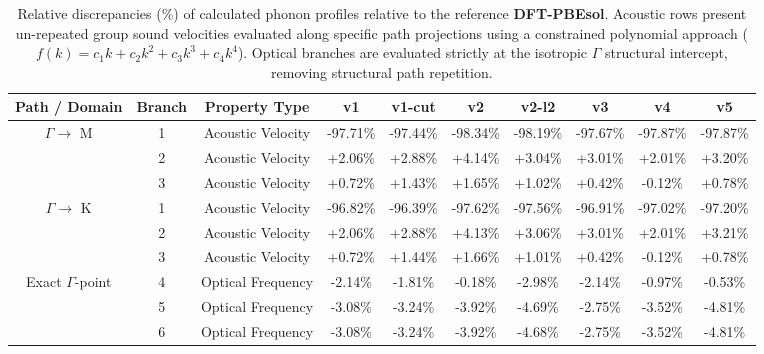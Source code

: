 \begin{table}[htbp]
  \centering
  \caption{Relative discrepancies (\%) of calculated phonon profiles relative to the reference \textbf{DFT-PBEsol}. Acoustic rows present un-repeated group sound velocities evaluated along specific path projections using a constrained polynomial approach ($f(k) = c_1 k + c_2 k^2 + c_3 k^3 + c_4 k^4$). Optical branches are evaluated strictly at the isotropic $\Gamma$ structural intercept, removing structural path repetition.}
  \label{tab:gamma_phonon_comparison}
  \begin{tabular}{cccccccccc}
    \hline\hline
    Path / Domain & Branch & Property Type  & v1 & v1-cut & v2 & v2-l2 & v3 & v4 & v5 \\
    \hline
    \midrule $\Gamma \rightarrow$ M & 1 & Acoustic Velocity  & -97.71\% & -97.44\% & -98.34\% & -98.19\% & -97.67\% & -97.87\% & -97.87\% \\
                                   & 2 & Acoustic Velocity  & +2.06\% & +2.88\% & +4.14\% & +3.04\% & +3.01\% & +2.01\% & +3.20\% \\
                                   & 3 & Acoustic Velocity  & +0.72\% & +1.43\% & +1.65\% & +1.02\% & +0.42\% & -0.12\% & +0.78\% \\
    \midrule $\Gamma \rightarrow$ K & 1 & Acoustic Velocity  & -96.82\% & -96.39\% & -97.62\% & -97.56\% & -96.91\% & -97.02\% & -97.20\% \\
                                   & 2 & Acoustic Velocity  & +2.06\% & +2.88\% & +4.13\% & +3.06\% & +3.01\% & +2.01\% & +3.21\% \\
                                   & 3 & Acoustic Velocity  & +0.72\% & +1.44\% & +1.66\% & +1.01\% & +0.42\% & -0.12\% & +0.78\% \\
    \midrule Exact $\Gamma$-point  & 4 & Optical Frequency   & -2.14\% & -1.81\% & -0.18\% & -2.98\% & -2.14\% & -0.97\% & -0.53\% \\
                                   & 5 & Optical Frequency   & -3.08\% & -3.24\% & -3.92\% & -4.69\% & -2.75\% & -3.52\% & -4.81\% \\
                                   & 6 & Optical Frequency   & -3.08\% & -3.24\% & -3.92\% & -4.68\% & -2.75\% & -3.52\% & -4.81\% \\
    \hline\hline
  \end{tabular}
\end{table}
